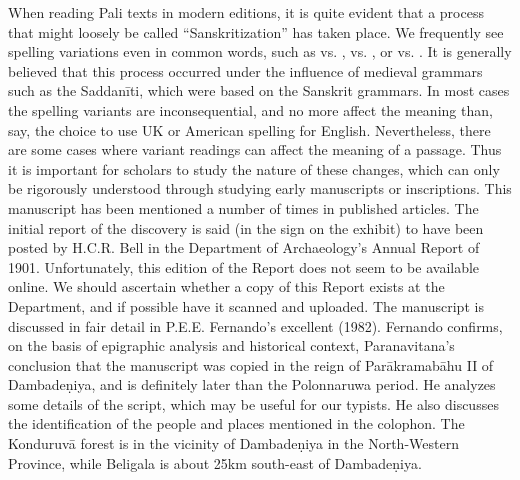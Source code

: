 {}When reading Pali texts in modern editions, it is quite evident that a process that might loosely be called “Sanskritization” has taken place. We frequently see spelling variations even in common words, such as  vs. ,  vs. , or  vs. . It is generally believed that this process occurred under the influence of medieval grammars such as the Saddanīti, which were based on the Sanskrit grammars. In most cases the spelling variants are inconsequential, and no more affect the meaning than, say, the choice to use UK or American spelling for English. Nevertheless, there are some cases where variant readings can affect the meaning of a passage. Thus it is important for scholars to study the nature of these changes, which can only be rigorously understood through studying early manuscripts or inscriptions.\markdownRendererInterblockSeparator
{}\markdownRendererInterblockSeparator
{}This manuscript has been mentioned a number of times in published articles.\markdownRendererInterblockSeparator
{}The initial report of the discovery is said (in the sign on the exhibit) to have been posted by H.C.R. Bell in the Department of Archaeology’s Annual Report of 1901. Unfortunately, this edition of the Report does not seem to be available online. We should ascertain whether a copy of this Report exists at the Department, and if possible have it scanned and uploaded.\markdownRendererInterblockSeparator
{}The manuscript is discussed in fair detail in P.E.E. Fernando’s excellent  (1982). Fernando confirms, on the basis of epigraphic analysis and historical context, Paranavitana’s conclusion that the manuscript was copied in the reign of Parākramabāhu II of Dambadeṇiya, and is definitely later than the Polonnaruwa period. He analyzes some details of the script, which may be useful for our typists. He also discusses the identification of the people and places mentioned in the colophon. The Konduruvā forest is in the vicinity of Dambadeṇiya in the North-Western Province, while Beligala is about 25km south-east of Dambadeṇiya.\markdownRendererInterblockSeparator
